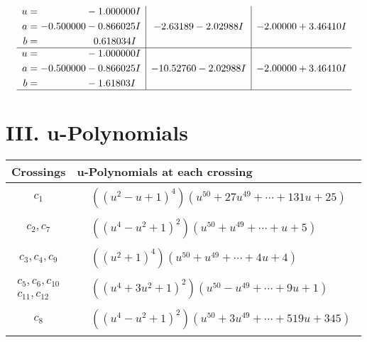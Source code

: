 \documentclass[1p]{elsarticle_modified}
\theoremstyle{definition}
\begin{document}
$$\begin{array}{c|c|c}
\begin{aligned}
u &= \phantom{-0.000000 } -1.000000 I \\
a &= -0.500000 - 0.866025 I \\
b &= \phantom{-0.000000 -}0.618034 I\end{aligned}
 & -2.63189 - 2.02988 I & -2.00000 + 3.46410 I \\ \hline\begin{aligned}
u &= \phantom{-0.000000 } -1.000000 I \\
a &= -0.500000 - 0.866025 I \\
b &= \phantom{-0.000000 } -1.61803 I\end{aligned}
 & -10.52760 - 2.02988 I & -2.00000 + 3.46410 I\\
 \hline 
 \end{array}$$\newpage
\newpage\renewcommand{\arraystretch}{1}
\centering \section*{ III. u-Polynomials}
\begin{tabular}{m{50pt}|m{274pt}}
Crossings & \hspace{64pt}u-Polynomials at each crossing \\
\hline $$\begin{aligned}c_{1}\end{aligned}$$&$\begin{aligned}
&((u^2- u+1)^4)(u^{50}+27 u^{49}+\cdots+131 u+25)
\end{aligned}$\\
\hline $$\begin{aligned}c_{2},c_{7}\end{aligned}$$&$\begin{aligned}
&((u^4- u^2+1)^2)(u^{50}+u^{49}+\cdots+u+5)
\end{aligned}$\\
\hline $$\begin{aligned}c_{3},c_{4},c_{9}\end{aligned}$$&$\begin{aligned}
&((u^2+1)^4)(u^{50}+u^{49}+\cdots+4 u+4)
\end{aligned}$\\
\hline $$\begin{aligned}c_{5},c_{6},c_{10}\\c_{11},c_{12}\end{aligned}$$&$\begin{aligned}
&((u^4+3 u^2+1)^2)(u^{50}- u^{49}+\cdots+9 u+1)
\end{aligned}$\\
\hline $$\begin{aligned}c_{8}\end{aligned}$$&$\begin{aligned}
&((u^4- u^2+1)^2)(u^{50}+3 u^{49}+\cdots+519 u+345)
\end{aligned}$\\
\hline
\end{tabular}\newpage\renewcommand{\arraystretch}{1}
\end{document}
